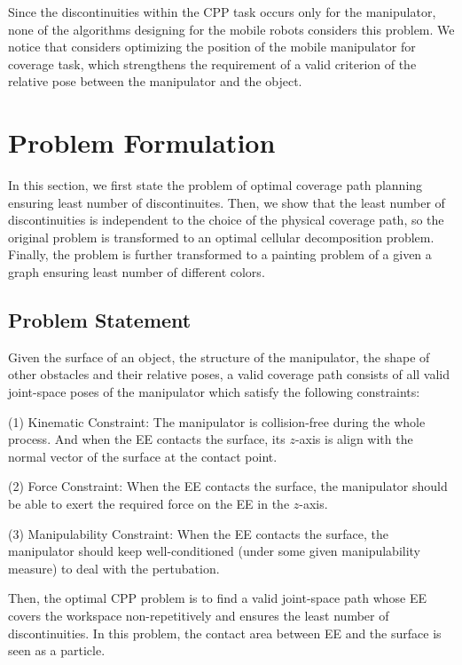 \documentclass[journal]{IEEEtran}
\begin{document}
Since the discontinuities within the CPP task occurs only for the manipulator, none of the algorithms designing for the mobile robots considers this problem. We notice that \cite{paus2017a} considers optimizing the position of the mobile manipulator for coverage task, which strengthens the requirement of a valid criterion of the relative pose between the manipulator and the object. 


\section{Problem Formulation}\label{sectionproblemformulation}
In this section, we first state the problem of optimal coverage path planning ensuring least number of discontinuites.
Then, we show that the least number of discontinuities is independent to the choice of the physical coverage path, so the original problem is transformed to an optimal cellular decomposition problem. 
Finally, the problem is further transformed to a painting problem of a given a graph ensuring least number of different colors. 


\subsection{Problem Statement}

Given the surface of an object, the structure of the manipulator, the shape of other obstacles and their relative poses, a valid coverage path consists of all valid joint-space poses of the manipulator which satisfy the following constraints:

(1) Kinematic Constraint: The manipulator is collision-free during the whole process. And when the EE contacts the surface, its $z$-axis is align with the normal vector of the surface at the contact point. 

(2) Force Constraint: When the EE contacts the surface, the manipulator should be able to exert the required force on the EE in the $z$-axis.  

(3) Manipulability Constraint: When the EE contacts the surface, the manipulator should keep well-conditioned (under some given  manipulability measure) to deal with the pertubation.

\noindent
Then, the optimal CPP problem is to find a valid joint-space path whose EE covers the workspace non-repetitively and ensures the least number of discontinuities.
In this problem, the contact area between EE and the surface is seen as a particle.
\end{document}
